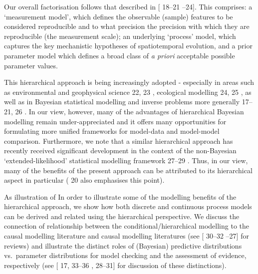 \documentclass[10pt,letterpaper]{article}
\providecommand{\DIFaddtex}[1]{{\protect\color{blue} \sf #1}} %
\providecommand{\DIFdeltex}[1]{{\protect\color{red} \scriptsize #1}} %
\providecommand{\DIFaddbegin}{} %
\providecommand{\DIFaddend}{} %
\providecommand{\DIFdelbegin}{} %
\providecommand{\DIFdelend}{} %
\providecommand{\DIFadd}[1]{\texorpdfstring{\DIFaddtex{#1}}{#1}} %
\providecommand{\DIFdel}[1]{\texorpdfstring{\DIFdeltex{#1}}{}} %
\begin{document}
Our \DIFdelbegin \DIFdel{overall }\DIFdelend factorisation follows that described in {[}\DIFdelbegin \DIFdel{18--21}\DIFdelend \DIFaddbegin \DIFadd{21--24}\DIFaddend {]}. This
comprises: a `measurement model', which defines the observable (sample)
features to be considered reproducible and \DIFdelbegin \DIFdel{to what precision }\DIFdelend \DIFaddbegin \DIFadd{the precision with which }\DIFaddend they
are reproducible (the measurement scale); an underlying `process' model,
which captures the key mechanistic hypotheses of spatiotemporal
evolution, and a prior parameter model which defines a broad class of
\emph{a priori} acceptable \DIFdelbegin \DIFdel{possible }\DIFdelend parameter values.

\DIFdelbegin \DIFdel{This hierarchical approach is being increasingly adopted - especially in
areas such as environmental and geophysical science }%
\DIFdel{22, 23}%
\DIFdel{,
ecological modelling }%
\DIFdel{24, 25}%
\DIFdel{, as well as in Bayesian statistical
modelling and inverse problems more generally }%
\DIFdel{17--21, 26}%
\DIFdel{. In our
view, however, many of the advantages of hierarchical Bayesian modelling
remain under-appreciated and it offers many opportunities for
formulating more unified frameworks for model-data and model-model
comparison. Furthermore, we note that a similar hierarchical approach
has recently received significant development in the context of the
non-Bayesian `extended-likelihood' statistical modelling framework
}%
\DIFdel{27--29}%
\DIFdel{. Thus, in our view, many of the benefits of the present
approach can be attributed to its hierarchical aspect in particular
(}%
\DIFdel{20}%
\DIFdel{also emphasises this point).
}%

\DIFdel{As illustration of }\DIFdelend \DIFaddbegin \DIFadd{In order to illustrate }\DIFaddend some of the modelling benefits of the
hierarchical approach, we show how both discrete and continuous process
models can be derived and related using the hierarchical perspective. We
discuss the \DIFdelbegin \DIFdel{connection of }\DIFdelend \DIFaddbegin \DIFadd{relationship between the }\DIFaddend conditional/hierarchical modelling
\DIFdelbegin \DIFdel{to the causal modelling literature }\DIFdelend \DIFaddbegin \DIFadd{and causal modelling literatures }\DIFaddend (see {[}\DIFdelbegin \DIFdel{30--32}\DIFdelend \DIFaddbegin \DIFadd{25--27}\DIFaddend {]} for reviews) and
illustrate the distinct roles of (Bayesian) predictive distributions
vs.~parameter distributions for model checking and the assessment of
evidence, respectively \DIFdelbegin \DIFdel{(see
}\DIFdelend {[}\DIFdelbegin \DIFdel{17, 33--36}\DIFdelend \DIFaddbegin \DIFadd{20, 28--31}\DIFaddend {]}\DIFdelbegin \DIFdel{for discussion of these distinctions)}\DIFdelend .
\end{document}
